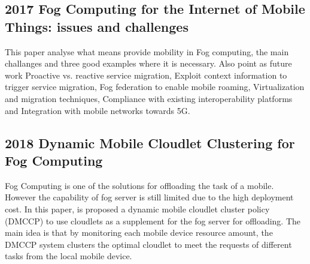 \subsection{2017 Fog Computing for the Internet of Mobile Things: issues and challenges}
\label{subsec:paper22} \cite{puliafito2017fog}
This paper analyse what means provide mobility in Fog computing, the main challanges and three good examples where it is necessary. Also point as future work Proactive vs. reactive service migration, Exploit context information to trigger service migration, Fog federation to enable mobile roaming, Virtualization and migration techniques, Compliance with existing interoperability platforms and Integration with mobile networks towards 5G.

\subsection{2018 Dynamic Mobile Cloudlet Clustering for Fog Computing}
\label{subsec:paper22} \cite{lidynamic}
Fog Computing is one of the solutions for offloading the task of a mobile. However the capability of fog server is still limited due to the high deployment cost. In this paper, is proposed a dynamic mobile cloudlet cluster policy (DMCCP) to use cloudlets as a supplement for the fog server for offloading. The main idea is that by monitoring each mobile device resource amount, the DMCCP system clusters the optimal cloudlet to meet the requests of different tasks from the local mobile device.





